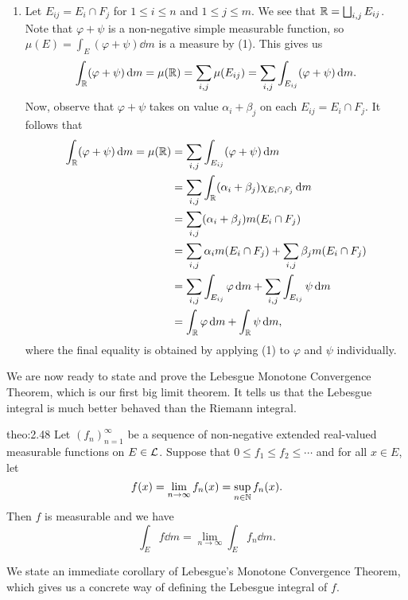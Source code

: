 \begin{pf}
\begin{enumerate}[(1)]
        \item Let $E_{ij} = E_i \cap F_j$ for $1 \leq i \leq n$ and $1 \leq j \leq m$. 
        We see that $\mathbb{R} = \bigsqcup_{i,j} E_{ij}$. Note that $\varphi + \psi$ 
        is a non-negative simple measurable function, so 
        $\mu(E) = \int_E (\varphi + \psi)\dd m$ is a measure by (1). 
        This gives us 
        \[ \int_{\mathbb{R}} (\varphi + \psi)\,\mathrm{d} m = \mu(\mathbb{R}) = 
        \sum_{i,j} \mu(E_{ij}) = \sum_{i,j} \int_{E_{ij}} (\varphi + \psi)\,\mathrm{d} m. \] 
        Now, observe that $\varphi + \psi$ takes on value $\alpha_i + \beta_j$ 
        on each $E_{ij} = E_i \cap F_j$. It follows that 
        \begin{align*}
            \int_{\mathbb{R}} (\varphi + \psi)\,\mathrm{d} m = \mu(\mathbb{R}) 
            &= \sum_{i,j} \int_{E_{ij}} (\varphi + \psi)\,\mathrm{d} m \\ 
            &= \sum_{i,j} \int_{\mathbb{R}} (\alpha_i + \beta_j) \chi_{E_i \cap F_j}\,\mathrm{d} m \\ 
            &= \sum_{i,j} (\alpha_i + \beta_j) m(E_i \cap F_j) \\ 
            &= \sum_{i,j} \alpha_i m(E_i \cap F_j) + \sum_{i,j} \beta_j m(E_i \cap F_j) \\ 
            &= \sum_{i,j} \int_{E_{ij}} \varphi\,\mathrm{d} m + \sum_{i,j} \int_{E_{ij}} \psi\,\mathrm{d} m \\ 
            &= \int_{\mathbb{R}} \varphi\,\mathrm{d} m + \int_{\mathbb{R}} \psi\,\mathrm{d} m, 
        \end{align*}
        where the final equality is obtained by applying (1) to $\varphi$ and 
        $\psi$ individually. \qedhere 
    \end{enumerate}
\end{pf}

We are now ready to state and prove the Lebesgue Monotone Convergence Theorem, 
which is our first big limit theorem. It tells us that the 
Lebesgue integral is much better behaved than the Riemann integral. 

\begin{theo}{theo:2.48}
    Let $(f_n)_{n=1}^\infty$ be a sequence of non-negative extended 
    real-valued measurable functions on $E \in {\cal L}$. Suppose that 
    $0 \leq f_1 \leq f_2 \leq \cdots$ and for all $x \in E$, let 
    \[ f(x) = \lim_{n\to\infty} f_n(x) = \sup_{n\in\mathbb{N}} f_n(x). \] 
    Then $f$ is measurable and we have 
    \[ \int_E f\dd m = \lim_{n\to\infty} \int_E f_n\dd m. \] 
\end{theo}

We state an immediate corollary of Lebesgue's Monotone Convergence Theorem, 
which gives us a concrete way of defining the Lebesgue integral of $f$. 


